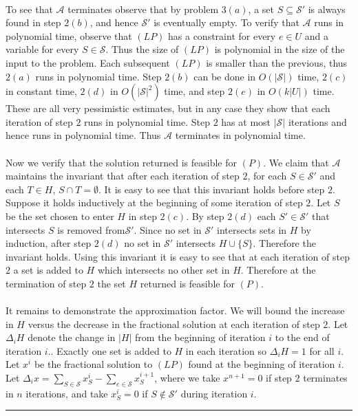 \documentclass[letterpaper,12pt,oneside,onecolumn]{article}
\newcommand{\cA}{\mathcal{A}} \newcommand{\cB}{\mathcal{B}}
\newcommand{\cS}{\mathcal{S}} \newcommand{\cT}{\mathcal{T}}
\newenvironment{proof}{{\bf Proof:  }}{\hfill\rule{2mm}{2mm}}
\begin{document}
\begin{proof}
\paragraph{}
To see that $\cA$ terminates observe that by problem $3(a)$, a set $S \subseteq \cS'$ is always found in step $2(b)$, and hence $\cS'$ is eventually empty. To verify that $\cA$ runs in polynomial time, observe that $(LP)$ has a constraint for every $e \in U$ and a variable for every $S \in \cS$. Thus the size of $(LP)$ is polynomial in the size of the input to the problem. Each subsequent $(LP)$ is smaller than the previous, thus $2(a)$ runs in polynomial time. Step $2(b)$ can be done in $O(|\cS|)$ time, $2(c)$ in constant time, $2(d)$ in $O(|\cS|^2)$ time, and step $2(e)$ in $O(k|U|)$ time. These are all very pessimistic estimates,  but in any case they show that each iteration of step $2$ runs in polynomial time. Step $2$ has at most $|\cS|$ iterations and hence runs in polynomial time. Thus $\cA$ terminates in polynomial time.
\paragraph{}
Now we verify that the solution returned is feasible for $(P)$. We claim that $\cA$ maintains the invariant that after each iteration of step $2$, for each $S \in \cS'$ and each $T \in H$, $S\cap T = \emptyset$. It is easy to see that this invariant holds before step $2$. Suppose it holds inductively at the beginning of some iteration of step $2$. Let $S$ be the set chosen to enter $H$ in step $2(c)$. By step $2(d)$ each $S' \in \cS'$ that intersects $S$ is removed from$ \cS'$. Since no set in $\cS'$ intersects sets in $H$ by induction, after step $2(d)$ no set in $\cS'$ intersects $H \cup \{S\}$. Therefore the invariant holds. Using this invariant it is easy to see that at each iteration of step $2$ a set is added to $H$ which intersects no other set in $H$. Therefore at the termination of step $2$ the set $H$ returned is feasible for $(P)$.
\paragraph{}
It remains to demonstrate the approximation factor. We will bound the increase in $H$ versus the decrease in the fractional solution at each iteration of step $2$. Let $\Delta_i H$ denote the change in $|H|$ from the beginning of iteration $i$ to the end of iteration $i$.. Exactly one set is added to $H$ in each iteration so $\Delta_i H = 1$ for all $i$. Let $x^i$ be the fractional solution to $(LP)$ found at the beginning of iteration $i$. Let $\Delta_i x = \sum_{S \in \cS}x^{i}_S - \sum_{e \in \cS}x^{i+1}_S$, where we take $x^{n+1} = 0$ if step $2$ terminates in $n$ iterations, and take $x^{i}_S = 0$ if $S \not\in \cS'$ during iteration $i$.

\end{proof}
\end{document}
